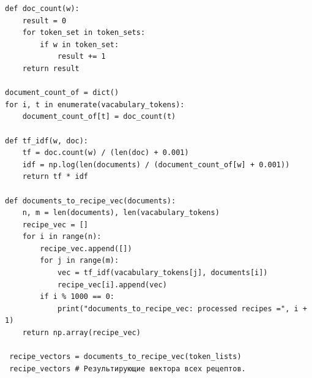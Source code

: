 \begin{lstlisting}[caption={Получение векторов рецептов}, label={lst:rvec_4}]
def doc_count(w):
    result = 0
    for token_set in token_sets:
        if w in token_set:
            result += 1
    return result

document_count_of = dict()
for i, t in enumerate(vacabulary_tokens):
    document_count_of[t] = doc_count(t)

def tf_idf(w, doc):
    tf = doc.count(w) / (len(doc) + 0.001)
    idf = np.log(len(documents) / (document_count_of[w] + 0.001))
    return tf * idf

def documents_to_recipe_vec(documents):
    n, m = len(documents), len(vacabulary_tokens)
    recipe_vec = []
    for i in range(n):
        recipe_vec.append([])
        for j in range(m):
            vec = tf_idf(vacabulary_tokens[j], documents[i])
            recipe_vec[i].append(vec)
        if i % 1000 == 0:
            print("documents_to_recipe_vec: processed recipes =", i + 1)
    return np.array(recipe_vec)
 
 recipe_vectors = documents_to_recipe_vec(token_lists)
 recipe_vectors # Результирующие вектора всех рецептов.
\end{lstlisting}
